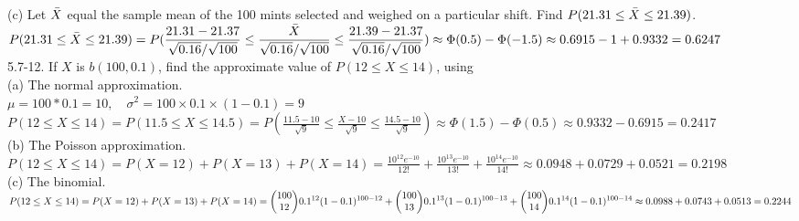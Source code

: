 \documentclass[12pt]{book}
\begin{document}
\begin{CJK}{UTF8}{bsmi}
(c) Let $\Bar{X}$ equal the sample mean of the 100 mints selected and weighed on a particular shift. Find $P(21.31 \le \Bar{X} \le 21.39)$. \\
$\displaystyle
P(21.31 \le \Bar{X} \le 21.39)
=P(\frac{21.31-21.37}{\sqrt{0.16}/\sqrt{100}} \le \frac{\Bar{X}}{\sqrt{0.16}/\sqrt{100}} \le \frac{21.39-21.37}{\sqrt{0.16}/\sqrt{100}})
\approx\Phi(0.5)-\Phi(-1.5)
\approx0.6915-1+0.9332
=0.6247$ \\

5.7-12. If $X$ is $b(100, 0.1)$, find the approximate value of $P(12 \le X \le 14)$, using \\
(a) The normal approximation. \\
$\mu=100*0.1=10,\quad\sigma^2=100\times0.1\times(1-0.1)=9$ \\
$\displaystyle
P(12 \le X \le 14)
=P(11.5\le X\le 14.5)
=P(\frac{11.5-10}{\sqrt{9}}\le\frac{X-10}{\sqrt{9}}\le\frac{14.5-10}{\sqrt{9}})
\approx\Phi(1.5)-\Phi(0.5)
\approx0.9332-0.6915
=0.2417$ \\

(b) The Poisson approximation. \\
$\displaystyle
P(12 \le X \le 14)
=P(X=12) + P(X=13) + P(X=14)
=\frac{10^{12}e^{-10}}{12!}+\frac{10^{13}e^{-10}}{13!}+\frac{10^{14}e^{-10}}{14!}
\approx0.0948+0.0729+0.0521
=0.2198$ \\

(c) The binomial. \\
$\displaystyle
P(12 \le X \le 14)
=P(X=12) + P(X=13) + P(X=14) \\
={\begin{pmatrix}100\\12\end{pmatrix}}0.1^{12} (1-0.1)^{100-12}+{\begin{pmatrix}100\\13\end{pmatrix}}0.1^{13} (1-0.1)^{100-13}+{\begin{pmatrix}100\\14\end{pmatrix}}0.1^{14} (1-0.1)^{100-14} \\[5pt]
\approx0.0988+0.0743+0.0513
=0.2244$ \\

\end{CJK}
\end{document}

